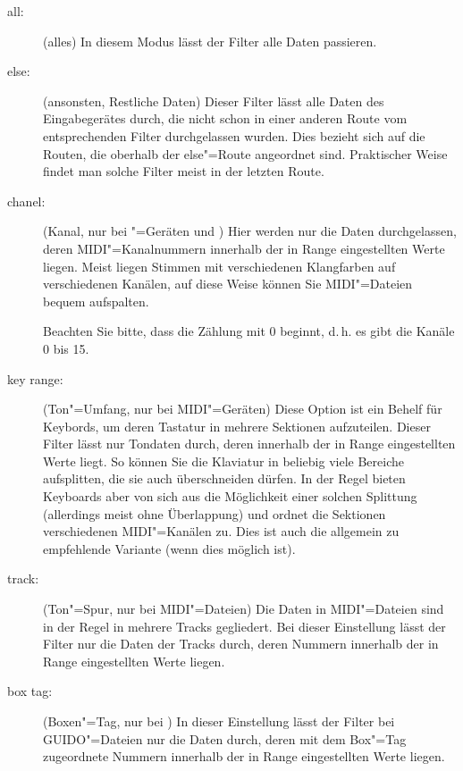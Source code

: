 {\begin{description}
\item[all:] (alles) In diesem Modus lässt der Filter alle Daten
  passieren.
\item[else:] (ansonsten, Restliche Daten) Dieser Filter lässt alle
  Daten des Eingabegerätes durch, die nicht schon in einer anderen
  Route vom entsprechenden Filter durchgelassen wurden. Dies bezieht
  sich auf die Routen, die oberhalb der else"=Route angeordnet sind.
  Praktischer Weise findet man solche Filter meist in der letzten
  Route.
\item[chanel:] (Kanal, nur bei "=Geräten und
  ) Hier werden nur die Daten
  durchgelassen, deren MIDI"=Kanalnummern innerhalb der in Range
  eingestellten Werte liegen. Meist liegen Stimmen mit verschiedenen
  Klangfarben auf verschiedenen Kanälen, auf diese Weise können Sie
  MIDI"=Dateien bequem aufspalten.

  Beachten Sie bitte, dass \mutabor{} die Zählung mit 0 beginnt, d.\,h.
  es gibt die Kanäle 0 bis 15.

\item[key range:] (Ton"=Umfang, nur bei MIDI"=Geräten) Diese Option
  ist ein Behelf für Keybords, um deren Tastatur in mehrere Sektionen
  aufzuteilen. Dieser Filter lässt nur Tondaten durch, deren
   innerhalb der in
  Range eingestellten Werte liegt. So können Sie die Klaviatur in
  beliebig viele Bereiche aufsplitten, die sie auch überschneiden
  dürfen. In der Regel bieten Keyboards aber von sich aus die
  Möglichkeit einer solchen Splittung (allerdings meist ohne
  Überlappung) und ordnet die Sektionen verschiedenen MIDI"=Kanälen zu.
  Dies ist auch die allgemein zu empfehlende Variante (wenn dies
  möglich ist).

\item[track:] (Ton"=Spur, nur bei MIDI"=Dateien) Die Daten in
  MIDI"=Dateien sind in der Regel in mehrere Tracks gegliedert. Bei
  dieser Einstellung lässt der Filter nur die Daten der Tracks durch,
  deren Nummern innerhalb der in Range eingestellten Werte liegen.


\item[box tag:] (Boxen"=Tag, nur bei
  ) In dieser Einstellung lässt
  der Filter bei GUIDO"=Dateien nur die Daten durch, deren mit dem
  Box"=Tag zugeordnete Nummern innerhalb der in Range eingestellten
  Werte liegen.



\end{description}}
